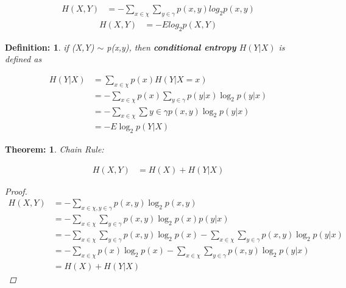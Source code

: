 \documentclass[11pt]{article}
\newtheorem{defn}{Definition:}
\newtheorem{theo}{Theorem:}
\begin{document}
\begin{equation}
\begin{aligned}
H(X,Y) &= - \sum \limits_{x \in \chi} \sum \limits_{y \in \gamma} p(x,y)log_{2} p(x,y)
\end{aligned}
\end{equation}
\begin{equation}
\begin{aligned}
H(X,Y)&=-Elog_{2}p(X,Y)
\end{aligned}
\end{equation}

\begin{defn}
if (X,Y) $\sim$ p(x,y), then \textbf{conditional entropy} $H(Y|X)$ is defined as
\end{defn}

\begin{align*}
H(Y|X)&=\sum \limits_{x \in \chi} p(x) H(Y|X=x)\\
&=-\sum \limits_{x \in \chi} p(x) \sum \limits_{y \in \gamma} p(y|x)\log_{2} p(y|x)\\
&= - \sum \limits_{x \in \chi} \sum \limits{y \in \gamma} p(x,y) \log_{2} p(y|x)\\
&=-E \log_{2} p(Y|X)
\end{align*}

\begin{theo}
\textit{Chain Rule:}

\begin{align*}
H(X,Y)&= H(X) + H(Y|X)
\end{align*}

\begin{proof}
\begin{align*}
H(X,Y)&=-\sum \limits_{x \in \chi, y \in \gamma} p(x,y)\log_{2}p(x,y)\\
&=- \sum \limits_{x \in \chi} \sum \limits_{y \in \gamma} p(x,y) \log_{2} p(x)p(y|x)\\
&=-\sum \limits_{x \in \chi} \sum \limits_{y \in \gamma}p(x,y)\log_{2}p(x) -\sum \limits_{x \in \chi} \sum \limits_{y \in \gamma} p(x,y)\log_{2}p(y|x)\\
&=-\sum \limits_{x \in \chi} p(x)\log_{2}p(x) -\sum\limits_{x \in \chi} \sum \limits_{y \in \gamma} p(x,y)\log_{2}p(y|x)\\
&=H(X) + H(Y|X) 
\end{align*}
\end{proof}

\end{theo}
\end{document}
